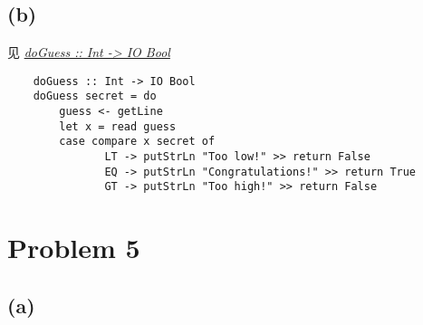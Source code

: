 \documentclass{paper}
\begin{document}
	\subsection*{(b)}
	见{} \href{./Guesser.hs}{\textit{doGuess :: Int -> IO Bool}}
	\begin{lstlisting}
	doGuess :: Int -> IO Bool
	doGuess secret = do
        guess <- getLine
        let x = read guess
        case compare x secret of 
               LT -> putStrLn "Too low!" >> return False 
               EQ -> putStrLn "Congratulations!" >> return True
               GT -> putStrLn "Too high!" >> return False

	\end{lstlisting}
	
\section*{Problem 5}
	\subsection*{(a)}
	
\end{document}
